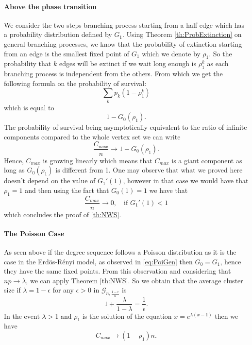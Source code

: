 \paragraph{Above the phase transition}
We consider the two steps branching process starting from a half edge which has a probability distribution defined by $G_1$.
Using Theorem \ref{th:ProbExtinction} on general branching processes, we know that the probability of extinction starting from an edge is the smallest fixed point of $G_1$ which we denote by $\rho_1$.
So the probability that $k$ edges will be extinct if we wait long enough is $\rho_1^k$ as each branching process is independent from the others.
From which we get the following formula on the probability of survival:
\begin{equation}
	\sum_k p_k(1-\rho_1^k) 
\end{equation}
which is equal to
\begin{equation}
	1 - G_0(\rho_1).
\end{equation}
The probability of survival being asymptotically equivalent to the ratio of infinite components compared to the whole vertex set we can write
\begin{equation}
	\frac{C_{max}}{n} \longrightarrow 1 - G_0(\rho_1).
\end{equation}
Hence, $C_{max}$ is growing linearly which means that $C_{max}$ is a giant component as long as $G_0(\rho_1)$ is different from 1.
One may observe that what we proved here doesn't depend on the value of $G_1'(1)$, however in that case we would have that $\rho_1 = 1$ and then using the fact that $G_0(1) = 1$ we have that 
\begin{equation}
	\frac{C_{max}}{n} \longrightarrow 0, \quad \text{if } G_1'(1) < 1
\end{equation}
which concludes the proof of \ref{th:NWS}.

\paragraph{The Poisson Case}
As seen above if the degree sequence follows a Poisson distribution as it is the case in the Erd\"os-R\'enyi model, as observed in \eqref{eq:PoiGen} then $G_0 = G_1$, hence they have the same fixed points.
From this observation and considering that $np \longrightarrow \lambda$, we can apply Theorem \ref{th:NWS}.
So we obtain that the average cluster size if $\lambda = 1-\epsilon$ for any $\epsilon >0$ in $\mathcal{G}_{n,\frac{1-\epsilon}{n}}$ is
\begin{equation}
	1 + \frac{\lambda}{1-\lambda} = \frac{1}{\epsilon}.
\end{equation}
In the event $\lambda > 1$ and $\rho_1$ is the solution of the equation $x=e^{\lambda(x-1)}$ then we have
\begin{equation}
	C_{max} \longrightarrow (1-\rho_1)n.
\end{equation}



